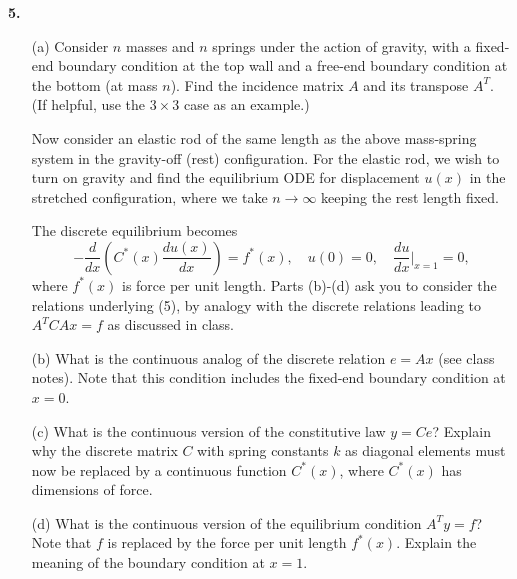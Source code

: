\documentclass{article}
\begin{document}
\vspace{0.5cm}


\noindent \textbf{5.}
\begin{itemize}
    \item[(a)] Consider $n$ masses and $n$ springs under the action of gravity, with a fixed-end boundary condition at the top wall and a free-end boundary condition at the bottom (at mass $n$). Find the incidence matrix $A$ and its transpose $A^T$. (If helpful, use the $3 \times 3$ case as an example.)
    
    Now consider an elastic rod of the same length as the above mass-spring system in the gravity-off (rest) configuration. For the elastic rod, we wish to turn on gravity and find the equilibrium ODE for displacement $u(x)$ in the stretched configuration, where we take $n \to \infty$ keeping the rest length fixed.
    
    The discrete equilibrium becomes
    \[
    -\frac{d}{dx} \left( C^*(x) \frac{du(x)}{dx} \right) = f^*(x), \quad u(0) = 0, \quad \frac{du}{dx}\bigg|_{x=1} = 0, \tag{5}
    \]
    where $f^*(x)$ is force per unit length. Parts (b)-(d) ask you to consider the relations underlying (5), by analogy with the discrete relations leading to $A^T C A x = f$ as discussed in class.
    
    \item[(b)] What is the continuous analog of the discrete relation $e = A x$ (see class notes). Note that this condition includes the fixed-end boundary condition at $x = 0$.
    
    \item[(c)] What is the continuous version of the constitutive law $y = C e$? Explain why the discrete matrix $C$ with spring constants $k$ as diagonal elements must now be replaced by a continuous function $C^*(x)$, where $C^*(x)$ has dimensions of force.
    
    \item[(d)] What is the continuous version of the equilibrium condition $A^T y = f$? Note that $f$ is replaced by the force per unit length $f^*(x)$. Explain the meaning of the boundary condition at $x = 1$.
\end{itemize}
\end{document}
